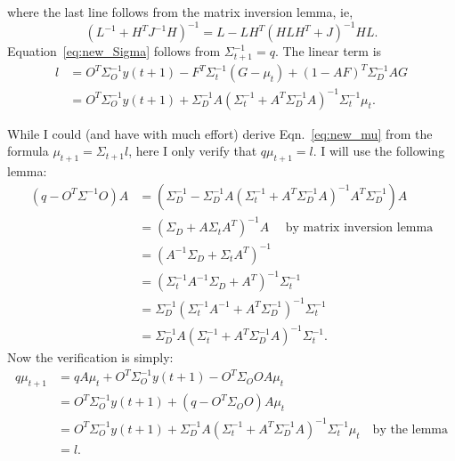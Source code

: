 \documentclass[11pt]{article}
\newcommand{\ti}[2]{{#1}{(#2)}}                         %
\begin{document}
where the last line follows from the matrix inversion lemma, ie,
\begin{equation*}
  (L^{-1} + H^T J^{-1} H)^{-1} = L - LH^T (HLH^T + J)^{-1} HL.
\end{equation*}
Equation~\eqref{eq:new_Sigma} follows from $\Sigma_{t+1}^{-1} = q$.
The linear term is
\begin{align*}
  l &= O^T\Sigma_O^{-1}y(t+1) - F^T \Sigma_t^{-1}(G-\mu_t) +
  (1-AF)^T\Sigma_D^{-1}AG \\
  &= O^T\Sigma_O^{-1}y(t+1) + \Sigma_D^{-1}A \left( \Sigma_t^{-1} +
    A^T \Sigma_D^{-1} A \right)^{-1} \Sigma_t^{-1} \mu_t.
\end{align*}

While I could (and have with much effort) derive
Eqn.~\eqref{eq:new_mu} from the formula $\mu_{t+1} = \Sigma_{t+1} l$,
here I only verify that $q \mu_{t+1} = l$.  I will use the following
lemma:
\begin{align*}
  (q-O^T\Sigma^{-1}O)A &= \left( \Sigma_D^{-1} - \Sigma_D^{-1} A (
    \Sigma_t^{-1} + A^T \Sigma_D^{-1} A)^{-1} A^T \Sigma_D^{-1}
  \right) A \\
  &= (\Sigma_D + A \Sigma_t A^T)^{-1} A \quad \text{ by matrix inversion
    lemma} \\
  &= (A^{-1} \Sigma_D + \Sigma_t A^T)^{-1} \\
  &= (\Sigma_t^{-1} A^{-1} \Sigma_D + A^T)^{-1} \Sigma_t^{-1}\\
  &= \Sigma_D^{-1} (\Sigma_t^{-1} A^{-1}  + A^T\Sigma_D^{-1})^{-1} \Sigma_t^{-1}\\
  &= \Sigma_D^{-1} A (\Sigma_t^{-1}  + A^T\Sigma_D^{-1} A)^{-1} \Sigma_t^{-1}.
\end{align*}
Now the verification is simply:
\begin{align*}
  q \mu_{t+1} &= qA\mu_t + O^T \Sigma_O^{-1} \ti{y}{t+1} - O^T
  \Sigma_O O A \mu_t \\
  &= O^T \Sigma_O^{-1} \ti{y}{t+1} + (q - O^T \Sigma_O O) A \mu_t \\
  &= O^T\Sigma_O^{-1}y(t+1) + \Sigma_D^{-1}A \left( \Sigma_t^{-1} +
    A^T \Sigma_D^{-1} A \right)^{-1} \Sigma_t^{-1} \mu_t \quad \text{
    by the lemma}\\
  &= l.
\end{align*}
\end{document}
